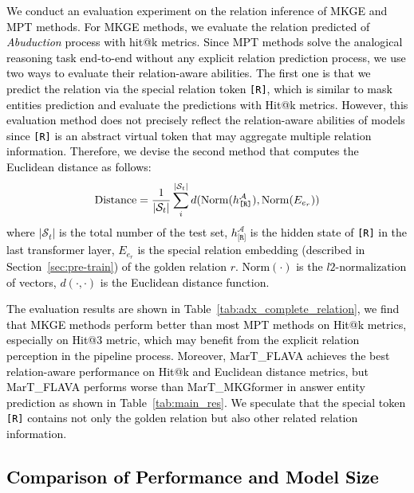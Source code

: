 \documentclass{article} \usepackage{iclr2023_conference,times}
\newcommand{\ours}{MarT}
\begin{document}
\textcolor{black}{We conduct an evaluation experiment on the relation inference of MKGE and MPT methods. For MKGE methods, we evaluate the relation predicted of \textit{Abuduction} process with hit@k metrics. Since MPT methods solve the analogical reasoning task end-to-end without any explicit relation prediction process, we use two ways to evaluate their relation-aware abilities. The first one is that we predict the relation via the special relation token \texttt{[R]}, which is similar to mask entities prediction and evaluate the predictions with Hit@k metrics. However, this evaluation method does not precisely reflect the relation-aware abilities of models since \texttt{[R]} is an abstract virtual token that may aggregate multiple relation information. Therefore, we devise the second method that computes the Euclidean distance as follows: }
\begin{equation}
     \textcolor{black}{\text{Distance}=\frac{1}{|\mathcal{S}_t|} \sum\limits_{i}^{|\mathcal{S}_t|}d(\text{Norm}(h_{\texttt{[R]}}^\mathcal{A}), \text{Norm}(E_{e_r}))}
\end{equation}
\textcolor{black}{
where $|\mathcal{S}_t|$ is the total number of the test set, $h_{\texttt{[R]}}^\mathcal{A}$ is the hidden state of \texttt{[R]} in the last transformer layer, $E_{e_r}$ is the special relation embedding (described in Section~\ref{sec:pre-train}) of the golden relation $r$. $\text{Norm}(\cdot)$ is the $l2\text{-normalization}$ of vectors, $d(\cdot, \cdot)$ is the Euclidean distance function.}

\textcolor{black}{
The evaluation results are shown in Table~\ref{tab:adx_complete_relation}, we find that MKGE methods perform better than most MPT methods on Hit@k metrics, especially on Hit@3 metric, which may benefit from the explicit relation perception in the pipeline process. Moreover, {\ours}\_FLAVA achieves the best relation-aware performance on Hit@k and Euclidean distance metrics, but {\ours}\_FLAVA performs worse than {\ours}\_MKGformer in answer entity prediction as shown in Table~\ref{tab:main_res}. We speculate that the special token \texttt{[R]} contains not only the golden relation but also other related relation information.
}














\subsection{\textcolor{black}{Comparison of Performance and Model Size}}
\end{document}
